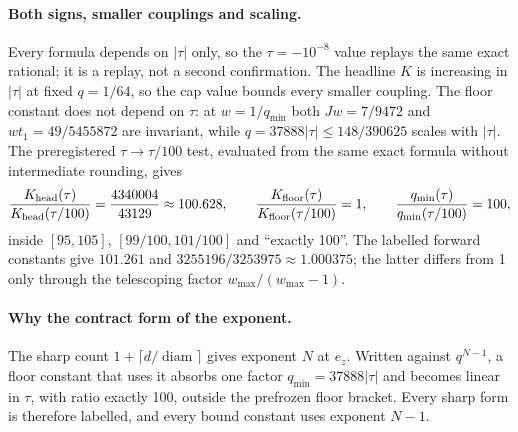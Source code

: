 \paragraph{Both signs, smaller couplings and scaling.} Every formula depends on
$|\tau|$ only, so the $\tau=-10^{-8}$ value replays the same exact rational; it
is a replay, not a second confirmation. The headline $K$ is increasing in
$|\tau|$ at fixed $q=1/64$, so the cap value bounds every smaller coupling.
The floor constant does not depend on $\tau$: at $w=1/q_{\min}$ both
$Jw=7/9472$ and $wt_1=49/5455872$ are invariant, while
$q=37888|\tau|\le148/390625$ scales with $|\tau|$. The preregistered
$\tau\to\tau/100$ test, evaluated from the same exact formula without
intermediate rounding, gives
\begin{equation}
 \frac{K_{\rm head}(\tau)}{K_{\rm head}(\tau/100)}=\frac{4340004}{43129}\approx100.628,\qquad
 \frac{K_{\rm floor}(\tau)}{K_{\rm floor}(\tau/100)}=1,\qquad
 \frac{q_{\min}(\tau)}{q_{\min}(\tau/100)}=100,
 \label{eq:ba1-scaling}
\end{equation}
inside $[95,105]$, $[99/100,101/100]$ and ``exactly 100''. The labelled
forward constants give $101.261$ and $3255196/3253975\approx1.000375$; the
latter differs from 1 only through the telescoping factor
$w_{\max}/(w_{\max}-1)$.

\paragraph{Why the contract form of the exponent.} The sharp count
$1+\lceil d/\operatorname{diam}\rceil$ gives exponent $N$ at $e_z$. Written
against $q^{N-1}$, a floor constant that uses it absorbs one factor
$q_{\min}=37888|\tau|$ and becomes linear in $\tau$, with ratio exactly 100,
outside the prefrozen floor bracket. Every sharp form is therefore labelled,
and every bound constant uses exponent $N-1$.

